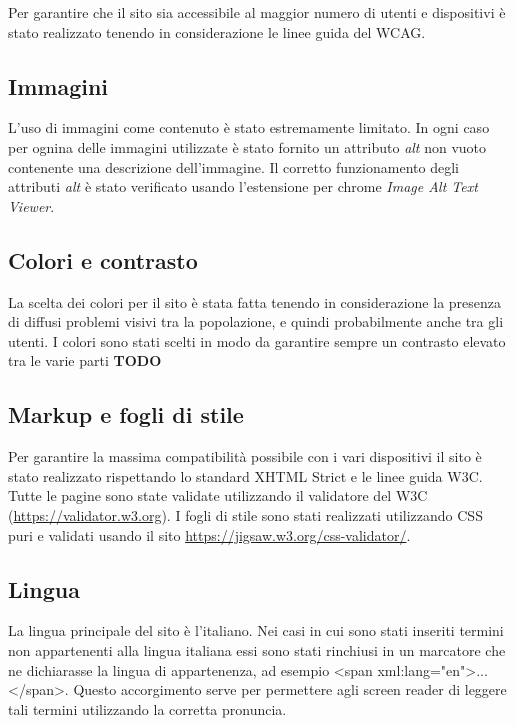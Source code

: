 Per garantire che il sito sia accessibile al maggior numero di utenti e dispositivi è stato realizzato tenendo in considerazione le linee guida del WCAG. \newline

\subsection{Immagini}
L'uso di immagini come contenuto è stato estremamente limitato. In ogni caso per ognina delle immagini utilizzate è stato fornito un attributo \textit{alt} non vuoto contenente una descrizione dell'immagine. Il corretto funzionamento degli attributi \textit{alt} è stato verificato usando l'estensione per chrome \textit{Image Alt Text Viewer}.

\subsection{Colori e contrasto}
La scelta dei colori per il sito è stata fatta tenendo in considerazione la presenza di diffusi problemi visivi tra la popolazione, e quindi probabilmente anche tra gli utenti. I colori sono stati scelti in modo da garantire sempre un contrasto elevato tra le varie parti \textbf{TODO}

\subsection{Markup e fogli di stile}
Per garantire la massima compatibilità possibile con i vari dispositivi il sito è stato realizzato rispettando lo standard XHTML Strict e le linee guida W3C. Tutte le pagine sono state validate utilizzando il validatore del W3C (\url{https://validator.w3.org}). \newline
I fogli di stile sono stati realizzati utilizzando CSS puri e validati usando il sito \url{https://jigsaw.w3.org/css-validator/}.

\subsection{Lingua}
La lingua principale del sito è l'italiano. Nei casi in cui sono stati inseriti termini non appartenenti alla lingua italiana essi sono stati rinchiusi in un marcatore che ne dichiarasse la lingua di appartenenza, ad esempio <span xml:lang="en">...</span>. Questo accorgimento serve per permettere agli screen reader di leggere tali termini utilizzando la corretta pronuncia.

